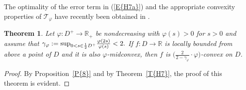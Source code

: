 \documentclass[12pt,leqno]{amsart}
\newtheorem{theorem}{Theorem}
\newtheorem*{theorem*}{Theorem}
\theoremstyle{definition}
\begin{document}
The optimality of the error term in {{\rm(\ref{E{H7a}})}} and the appropriate convexity properties of
${\mathscr{T}}_\varphi$ have recently been obtained in \cite{MakPal10b}.

{
  {\begin{theorem}\label{T{8}}{Let $\varphi:D^+\to {\mathbb{R}}_+$ be nondecreasing with $\varphi(s)>0$ for $s>0$
and assume that $\gamma_\varphi:={\mathop{\mbox{\rm sup}}}_{0<s\in\frac12D^+}\frac{\varphi(2s)}{\varphi(s)}<2.$
If $f:D\to {\mathbb{R}}$ is locally bounded from above a point of $D$ and it is also
$\varphi$-midconvex, then $f$ is $\big(\frac{2}{2-\gamma_\varphi}\cdot\varphi\big)$-convex on $D$.}\end{theorem}}}

\begin{proof}
By {Proposition~\ref{P{8}}} and by {Theorem~\ref{T{H7}}}, the proof of this theorem is evident.
\end{proof}
\end{document}
